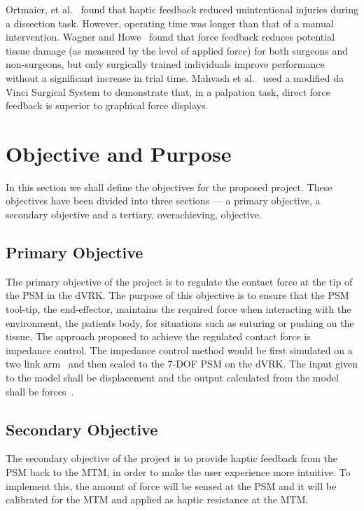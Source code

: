 \documentclass[10pt,journal,compsoc]{IEEEtran}
\begin{document}
Ortmaier, et al.~\cite{puangmali2008} found that haptic feedback reduced unintentional injuries during a dissection task. However, operating time was longer than that of a manual intervention. Wagner and Howe~\cite{wagner2007} found that force feedback reduces potential tissue damage (as measured by the level of applied force) for both surgeons and non-surgeons, but only surgically trained individuals improve performance without a significant increase in trial time. Mahvash et al.~\cite{mahvash2008} used a modified da Vinci Surgical System to demonstrate that, in a palpation task, direct force feedback is superior to graphical force displays. 

\section{Objective and Purpose}
In this section we shall define the objectives for the proposed project. These objectives have been divided into three sections --- a primary objective, a secondary objective and a tertiary, overachieving, objective.

\subsection{Primary Objective}
The primary objective of the project is to regulate the contact force at the tip of the PSM in the dVRK. The purpose of this objective is to ensure that the PSM tool-tip, the end-effector, maintains the required force when interacting with the environment, the patient\textquotesingle s body, for situations such as suturing or pushing on the tissue. The approach proposed to achieve the regulated contact force is impedance control. The impedance control method would be first simulated on a two link arm~\cite{hogan1984} and then scaled to the 7-DOF PSM on the dVRK. The input given to the model shall be displacement and the output calculated from the model shall be forces~\cite{hogan1984}.

\subsection{Secondary Objective}
The secondary objective of the project is to provide haptic feedback from the PSM back to the MTM, in order to make the user experience more intuitive. To implement this, the amount of force will be sensed at the PSM and it will be calibrated for the MTM and applied as haptic resistance at the MTM. 
\end{document}
